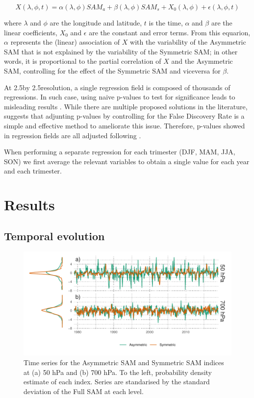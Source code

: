 \documentclass[]{ametsocV5}
\begin{document}
\[
X(\lambda, \phi, t) = \alpha(\lambda, \phi) SAM_a + \beta(\lambda, \phi) SAM_s + X_0(\lambda, \phi) +  \epsilon(\lambda, \phi, t)
\]

where \(\lambda\) and \(\phi\) are the longitude and latitude, \(t\) is
the time, \(\alpha\) and \(\beta\) are the linear coefficients, \(X_0\)
and \(\epsilon\) are the constant and error terms. From this equarion,
\(\alpha\) represents the (linear) association of \(X\) with the
variability of the Asymmetric SAM that is not explained by the
variability of the Symmetric SAM; in other words, it is proportional to
the partial correlation of \(X\) and the Asymmetric SAM, controlling for
the effect of the Symmetric SAM and viceversa for \(\beta\).

At 2.5\degree by 2.5\degree resolution, a single regression field is
composed of thousands of regressions. In such case, using naive p-values
to test for significance leads to misleading results
\citep{walker1914, katz1991}. While there are multiple proposed
solutions in the literature, \citet{wilks2016} suggests that adjunting
p-values by controlling for the False Discovery Rate
\citep{benjamini1995} is a simple and effective method to ameliorate
this issue. Therefore, p-values showed in regression fields are all
adjusted following \citet{benjamini1995}.

When performing a separate regression for each trimester (DJF, MAM, JJA,
SON) we first average the relevant variables to obtain a single value
for each year and each trimester.

\section{Results}

\subsection{Temporal evolution}

\begin{figure}
\includegraphics{asymsam-timeseries-1} \caption[Time series for the Asymmetric SAM and Symmetric SAM indices at (a) 50 hPa and (b) 700 hPa]{Time series for the Asymmetric SAM and Symmetric SAM indices at (a) 50 hPa and (b) 700 hPa. To the left, probability density estimate of each index. Series are standarised by the standard deviation of the Full SAM at each level.}\label{fig:asymsam-timeseries}
\end{figure}
\end{document}
